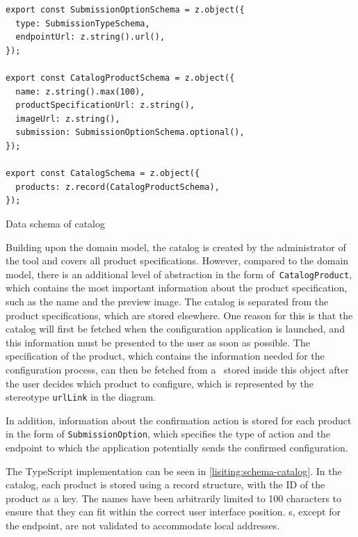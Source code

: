 \begin{listing}[h]
\begin{verbatim}
export const SubmissionOptionSchema = z.object({
  type: SubmissionTypeSchema,
  endpointUrl: z.string().url(),
});

export const CatalogProductSchema = z.object({
  name: z.string().max(100),
  productSpecificationUrl: z.string(),
  imageUrl: z.string(),
  submission: SubmissionOptionSchema.optional(),
});

export const CatalogSchema = z.object({
  products: z.record(CatalogProductSchema),
});
\end{verbatim}
\caption{Data schema of catalog}
\label{lisiting:schema-catalog}
\end{listing}

Building upon the domain model, the catalog is created by the administrator of the tool and covers all product specifications. However, compared to the domain model, there is an additional level of abstraction in the form of~\texttt{CatalogProduct}, which contains the most important information about the product specification, such as the name and the preview image. The catalog is separated from the product specifications, which are stored elsewhere. One reason for this is that the catalog will first be fetched when the configuration application is launched, and this information must be presented to the user as soon as possible. The specification of the product, which contains the information needed for the configuration process, can then be fetched from a~ stored inside this object after the user decides which product to configure, which is represented by the stereotype \texttt{urlLink} in the  diagram.

In addition, information about the confirmation action is stored for each product in the form of \texttt{SubmissionOption}, which specifies the type of action and the endpoint to which the application potentially sends the confirmed configuration.

The TypeScript implementation can be seen in \autoref{lisiting:schema-catalog}. In the catalog, each product is stored using a record structure, with the ID of the product as a key. The names have been arbitrarily limited to 100 characters to ensure that they can fit within the correct user interface position. s, except for the endpoint, are not validated to accommodate local addresses.


